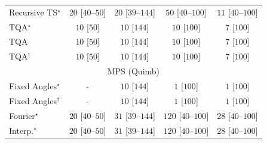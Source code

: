 \begin{tabular}{l|cccc|}
Recursive TS$^\star$ & {\cellcolor[HTML]{F4FBF1}} \color[HTML]{000000} $20$ [$40$--$50$] & {\cellcolor[HTML]{F4FBF1}} \color[HTML]{000000} $20$ [$39$--$144$] & {\cellcolor[HTML]{EEF8EA}} \color[HTML]{000000} $50$ [$40$--$100$] & {\cellcolor[HTML]{F5FBF3}} \color[HTML]{000000} $11$ [$40$--$100$] \\
TQA$^\star$ & {\cellcolor[HTML]{F6FCF4}} \color[HTML]{000000} $10$ [$50$] & {\cellcolor[HTML]{F6FCF4}} \color[HTML]{000000} $10$ [$144$] & {\cellcolor[HTML]{F6FCF4}} \color[HTML]{000000} $10$ [$100$] & {\cellcolor[HTML]{F6FCF4}} \color[HTML]{000000} $7$ [$100$] \\
TQA & {\cellcolor[HTML]{F6FCF4}} \color[HTML]{000000} $10$ [$50$] & {\cellcolor[HTML]{F6FCF4}} \color[HTML]{000000} $10$ [$144$] & {\cellcolor[HTML]{F6FCF4}} \color[HTML]{000000} $10$ [$100$] & {\cellcolor[HTML]{F6FCF4}} \color[HTML]{000000} $7$ [$100$] \\
TQA$^\dagger$ & {\cellcolor[HTML]{F6FCF4}} \color[HTML]{000000} $10$ [$50$] & {\cellcolor[HTML]{F6FCF4}} \color[HTML]{000000} $10$ [$144$] & {\cellcolor[HTML]{F6FCF4}} \color[HTML]{000000} $10$ [$100$] & {\cellcolor[HTML]{F6FCF4}} \color[HTML]{000000} $7$ [$100$] \\
\cline{1-5}
\multicolumn{5}{c}{\rule{0pt}{8pt}MPS (Quimb)} \\
\midrule
Fixed Angles$^\star$ & {\cellcolor[HTML]{000000}} \color[HTML]{F1F1F1} {\cellcolor{white}} \color{black} - & {\cellcolor[HTML]{F6FCF4}} \color[HTML]{000000} $10$ [$144$] & {\cellcolor[HTML]{F7FCF5}} \color[HTML]{000000} $1$ [$100$] & {\cellcolor[HTML]{F7FCF5}} \color[HTML]{000000} $1$ [$100$] \\
Fixed Angles$^\dagger$ & {\cellcolor[HTML]{000000}} \color[HTML]{F1F1F1} {\cellcolor{white}} \color{black} - & {\cellcolor[HTML]{F6FCF4}} \color[HTML]{000000} $10$ [$144$] & {\cellcolor[HTML]{F7FCF5}} \color[HTML]{000000} $1$ [$100$] & {\cellcolor[HTML]{F7FCF5}} \color[HTML]{000000} $1$ [$100$] \\
Fourier$^\star$ & {\cellcolor[HTML]{F4FBF1}} \color[HTML]{000000} $20$ [$40$--$50$] & {\cellcolor[HTML]{F2FAEF}} \color[HTML]{000000} $31$ [$39$--$144$] & {\cellcolor[HTML]{DEF2D9}} \color[HTML]{000000} $120$ [$40$--$100$] & {\cellcolor[HTML]{F2FAF0}} \color[HTML]{000000} $28$ [$40$--$100$] \\
Interp.$^\star$ & {\cellcolor[HTML]{F4FBF1}} \color[HTML]{000000} $20$ [$40$--$50$] & {\cellcolor[HTML]{F2FAEF}} \color[HTML]{000000} $31$ [$39$--$144$] & {\cellcolor[HTML]{DEF2D9}} \color[HTML]{000000} $120$ [$40$--$100$] & {\cellcolor[HTML]{F2FAF0}} \color[HTML]{000000} $28$ [$40$--$100$] \\

\end{tabular}
